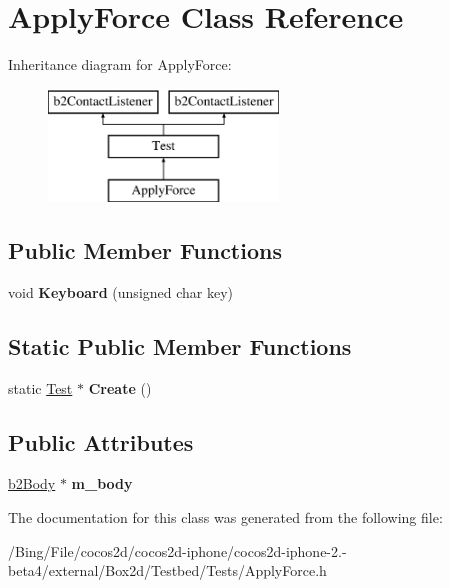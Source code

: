\hypertarget{class_apply_force}{\section{Apply\-Force Class Reference}
\label{class_apply_force}
}
Inheritance diagram for Apply\-Force\-:\begin{figure}[H]
\begin{center}
\leavevmode
\includegraphics[height=3.000000cm]{class_apply_force}
\end{center}
\end{figure}
\subsection*{Public Member Functions}
\begin{DoxyCompactItemize}
\item 
\hypertarget{class_apply_force_a9353a37286096cbda29514a901c7f893}{void {\bfseries Keyboard} (unsigned char key)}\label{class_apply_force_a9353a37286096cbda29514a901c7f893}

\end{DoxyCompactItemize}
\subsection*{Static Public Member Functions}
\begin{DoxyCompactItemize}
\item 
\hypertarget{class_apply_force_a99fb2fe00fbb7ce96291acb0d7834966}{static \hyperlink{class_test}{Test} $\ast$ {\bfseries Create} ()}\label{class_apply_force_a99fb2fe00fbb7ce96291acb0d7834966}

\end{DoxyCompactItemize}
\subsection*{Public Attributes}
\begin{DoxyCompactItemize}
\item 
\hypertarget{class_apply_force_a356f4e313f86b47cfacb6fdf1b48cf1f}{\hyperlink{classb2_body}{b2\-Body} $\ast$ {\bfseries m\-\_\-body}}\label{class_apply_force_a356f4e313f86b47cfacb6fdf1b48cf1f}

\end{DoxyCompactItemize}


The documentation for this class was generated from the following file\-:\begin{DoxyCompactItemize}
\item 
/\-Bing/\-File/cocos2d/cocos2d-\/iphone/cocos2d-\/iphone-\/2.-\/beta4/external/\-Box2d/\-Testbed/\-Tests/Apply\-Force.\-h\end{DoxyCompactItemize}
